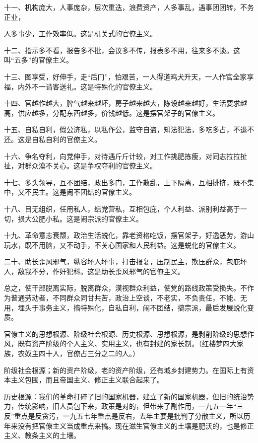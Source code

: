 十一、机构庞大，人事庞杂，层次重迭，浪费资产，人多事乱，遇事团团转，不务正业，

人多事少，工作效率低。这是机关式的官僚主义。

十二、指示多不看，报告多不批，会议多不传，报表多不用，往来多不谈。这叫“五多”的官僚主义。

十三、图享受，好伸手，走“后门”，怕艰苦，一人得道鸡犬升天，一人作官全家享福，内外不一请客送礼。这是特殊化的官僚主义。

十四、官越作越大，脾气越来越坏，房子越来越大，陈设越来越好，生活要求越高，供应越多，分配东西越多，价钱越低。这是摆官架子的官僚主义。

十五、自私自利，假公济私，以私作公，监守自盗，知法犯法，多吃多占，不退不还。这是自私自利的官僚主义。

十六、争名夺利，向党伸手，对待遇斤斤计较，对工作挑肥拣瘦，对同志拉拉扯扯，对群众漠不关心。这是争权夺利的官僚主义。

十七、多头领导，互不团结，政出多门，工作散乱，上下隔离，互相排挤，既不集中，又不民主。这是闹不团结的官僚主义。

十八、目无组织，任用私人，结党营私，互相包庇，个人利益、派别利益高于一切，损大公肥小私。这是闹宗派的官僚主义。

十九、革命意志衰颓，政治生活蜕化，靠老资格吃饭，摆官架子，好逸恶劳，游山玩水，既不用脑，又不动手，不关心国家和人民利益。这是蜕化的官僚主义。

二十、助长歪风邪气，纵容坏人坏事，打击报复，压制民主，欺压群众，包庇坏人，敌我不分，作奸犯科。这是助长歪风邪气的官僚主义。

总之，使干部脱离实际，脱离群众，漠视群众利益，使党的路线政策受损失。不作为普通劳动者，不同群众同甘共苦，政治上空谈，不老实，不负责任，不能、无用，埋头于事务主义，搞特殊化，自私自利，闹不团结，搞宗派，最后发展蜕化变质。

官僚主义的思想根源、阶级社会根源、历史根源、思想根源，是剥削阶级的思想作风，既有资产阶级的个人主义、实用主义，也有封建的家长制。（红楼梦四大家族，农奴主四十人，官僚占三分之二的人。）

阶级社会根源；新的资产阶级，老的资产阶级，还有城乡封建势力。在国际上有资本主义包围，而且帝国主义、修正主义联合起来了。

历史根源：我们的革命打碎了旧的国家机器，建立了新的国家机器，但旧的统治势力，传统影响，旧人员包下来，政策是对的，但带来了副作用，一九五一年“三反”重点是反贪污，一九五七年重点是反右，去年主要是批判了分散主义，所以历年来没有把官僚主义当成重点来搞。现在滋生官僚主义的土壤是肥沃的，也是修正主义、教条主义的土壤。

